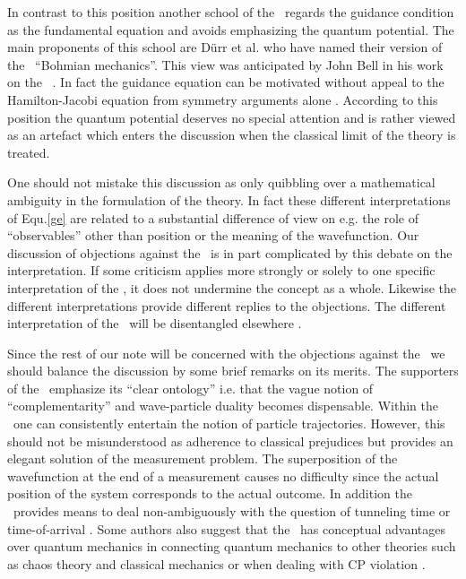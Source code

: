 In contrast to this position another school of the \dbb\ regards the guidance condition as the fundamental equation and avoids
emphasizing the quantum potential. The main proponents of this school are  D\"urr et al. \cite{duerr,nor,dgz,duerr97} 
who have named their version of the \dbb\ ``Bohmian mechanics''. This view was anticipated by John Bell in his work on the \dbb\
\cite{speakable}. 
In fact the guidance equation can 
be motivated without appeal to the Hamilton-Jacobi equation from symmetry arguments alone \cite{dgz}. According to this 
position the quantum potential deserves no special attention and is rather viewed as an artefact which enters the discussion 
when the classical limit of the theory is treated. 

One should not mistake this discussion as only quibbling over a mathematical ambiguity in the formulation of the theory. 
In fact these different interpretations of Equ.\ref{ge} are related to a substantial difference of view on e.g. the role of 
``observables'' 
other than position or the meaning of the wavefunction. Our discussion of objections against the \dbb\ is in part complicated  
by this debate 
on the interpretation. If some criticism applies more strongly or solely to one specific interpretation of the \dbb, it does not 
undermine the concept as a whole. Likewise the different interpretations provide different replies to the objections.
The different interpretation of the \dbb\ will be disentangled elsewhere \cite{int_of_bm}.

Since the rest of our note will be concerned with the objections against the \dbb\ we should balance the discussion
by some brief remarks on its merits.  The supporters of the \dbb\  emphasize its ``clear ontology'' i.e. that the   
vague notion of ``complementarity'' and wave-particle duality becomes dispensable. Within the \dbb\ one can consistently entertain 
the notion of particle trajectories. However, this should not be misunderstood as adherence to classical prejudices but
provides an elegant solution of the measurement problem. The superposition of the wavefunction at the end of a measurement 
causes no difficulty since the actual position of the system corresponds to the actual outcome.
In addition the \dbb\ provides means to deal non-ambiguously  with the question of tunneling time or time-of-arrival 
\cite{gruebl,leavens,leavens2}. Some authors also suggest that the \dbb\ has conceptual advantages over quantum mechanics in connecting 
quantum mechanics to other theories such as chaos theory and classical mechanics \cite{cushing_bowman} or when dealing with CP 
violation \cite{home}.

